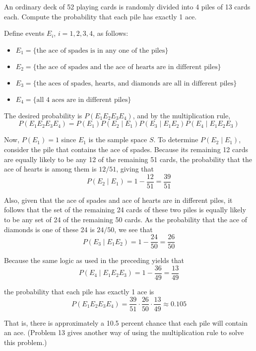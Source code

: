         \begin{example}
            An ordinary deck of 52 playing cards is randomly divided into 4 piles of 13 cards each. Compute the probability that each pile has exactly 1 ace.
            \begin{solution}
            Define events \(E_i\), \(i = 1, 2, 3, 4\), as follows:
            \begin{itemize}
                \item \(E_1 = \{\text{the ace of spades is in any one of the piles}\}\)
                \item \(E_2 = \{\text{the ace of spades and the ace of hearts are in different piles}\}\)
                \item \(E_3 = \{\text{the aces of spades, hearts, and diamonds are all in different piles}\}\)
                \item \(E_4 = \{\text{all 4 aces are in different piles}\}\)
            \end{itemize}
            
            The desired probability is \(P(E_1 E_2 E_3 E_4)\), and by the multiplication rule,
            \[
            P(E_1 E_2 E_3 E_4) = P(E_1) P(E_2 \mid E_1) P(E_3 \mid E_1 E_2) P(E_4 \mid E_1 E_2 E_3)
            \]
            
            Now, \(P(E_1) = 1\) since \(E_1\) is the sample space \(S\). To determine \(P(E_2 \mid E_1)\), consider the pile that contains the ace of spades. Because its remaining 12 cards are equally likely to be any 12 of the remaining 51 cards, the probability that the ace of hearts is among them is \(12/51\), giving that
            \[
            P(E_2 \mid E_1) = 1 - \frac{12}{51} = \frac{39}{51}
            \]
            
            Also, given that the ace of spades and ace of hearts are in different piles, it follows that the set of the remaining 24 cards of these two piles is equally likely to be any set of 24 of the remaining 50 cards. As the probability that the ace of diamonds is one of these 24 is \(24/50\), we see that
            \[
            P(E_3 \mid E_1 E_2) = 1 - \frac{24}{50} = \frac{26}{50}
            \]
            
            Because the same logic as used in the preceding yields that
            \[
            P(E_4 \mid E_1 E_2 E_3) = 1 - \frac{36}{49} = \frac{13}{49}
            \]
            
            the probability that each pile has exactly 1 ace is
            \[
            P(E_1 E_2 E_3 E_4) = \frac{39}{51} \cdot \frac{26}{50} \cdot \frac{13}{49} \approx 0.105
            \]
            
            That is, there is approximately a 10.5 percent chance that each pile will contain an ace. (Problem 13 gives another way of using the multiplication rule to solve this problem.)
            \end{solution}
            \end{example}
	
